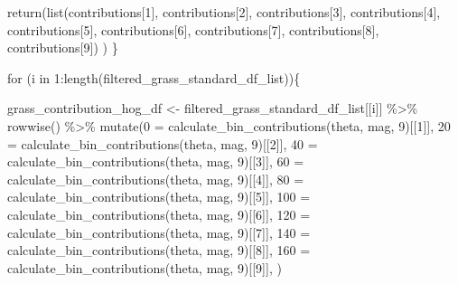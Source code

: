 \documentclass[
  letterpaper,
  DIV=11,
  numbers=noendperiod]{scrreprt}
\newenvironment{Shaded}{\begin{snugshade}}{\end{snugshade}}
\newcommand{\AttributeTok}[1]{\textcolor[rgb]{0.40,0.45,0.13}{#1}}
\newcommand{\ControlFlowTok}[1]{\textcolor[rgb]{0.00,0.23,0.31}{#1}}
\newcommand{\DecValTok}[1]{\textcolor[rgb]{0.68,0.00,0.00}{#1}}
\newcommand{\FunctionTok}[1]{\textcolor[rgb]{0.28,0.35,0.67}{#1}}
\newcommand{\NormalTok}[1]{\textcolor[rgb]{0.00,0.23,0.31}{#1}}
\newcommand{\OtherTok}[1]{\textcolor[rgb]{0.00,0.23,0.31}{#1}}
\newcommand{\SpecialCharTok}[1]{\textcolor[rgb]{0.37,0.37,0.37}{#1}}
\newcommand{\StringTok}[1]{\textcolor[rgb]{0.13,0.47,0.30}{#1}}
\begin{document}
\begin{Shaded}
\begin{Highlighting}[]
  \FunctionTok{return}\NormalTok{(}\FunctionTok{list}\NormalTok{(contributions[}\DecValTok{1}\NormalTok{],}
\NormalTok{         contributions[}\DecValTok{2}\NormalTok{],}
\NormalTok{         contributions[}\DecValTok{3}\NormalTok{],}
\NormalTok{         contributions[}\DecValTok{4}\NormalTok{],}
\NormalTok{         contributions[}\DecValTok{5}\NormalTok{],}
\NormalTok{         contributions[}\DecValTok{6}\NormalTok{],}
\NormalTok{         contributions[}\DecValTok{7}\NormalTok{],}
\NormalTok{         contributions[}\DecValTok{8}\NormalTok{],}
\NormalTok{         contributions[}\DecValTok{9}\NormalTok{])}
\NormalTok{         )}
\NormalTok{\}}
 
\ControlFlowTok{for}\NormalTok{ (i }\ControlFlowTok{in} \DecValTok{1}\SpecialCharTok{:}\FunctionTok{length}\NormalTok{(filtered\_grass\_standard\_df\_list))\{}
  
\NormalTok{  grass\_contribution\_hog\_df }\OtherTok{\textless{}{-}} 
\NormalTok{    filtered\_grass\_standard\_df\_list[[i]] }\SpecialCharTok{\%\textgreater{}\%}
    \FunctionTok{rowwise}\NormalTok{() }\SpecialCharTok{\%\textgreater{}\%}
    \FunctionTok{mutate}\NormalTok{(}\StringTok{\textasciigrave{}}\AttributeTok{0}\StringTok{\textasciigrave{}} \OtherTok{=} \FunctionTok{calculate\_bin\_contributions}\NormalTok{(theta, mag, }\DecValTok{9}\NormalTok{)[[}\DecValTok{1}\NormalTok{]],}
           \StringTok{\textasciigrave{}}\AttributeTok{20}\StringTok{\textasciigrave{}} \OtherTok{=} \FunctionTok{calculate\_bin\_contributions}\NormalTok{(theta, mag, }\DecValTok{9}\NormalTok{)[[}\DecValTok{2}\NormalTok{]],}
           \StringTok{\textasciigrave{}}\AttributeTok{40}\StringTok{\textasciigrave{}} \OtherTok{=} \FunctionTok{calculate\_bin\_contributions}\NormalTok{(theta, mag, }\DecValTok{9}\NormalTok{)[[}\DecValTok{3}\NormalTok{]],}
           \StringTok{\textasciigrave{}}\AttributeTok{60}\StringTok{\textasciigrave{}} \OtherTok{=} \FunctionTok{calculate\_bin\_contributions}\NormalTok{(theta, mag, }\DecValTok{9}\NormalTok{)[[}\DecValTok{4}\NormalTok{]],}
           \StringTok{\textasciigrave{}}\AttributeTok{80}\StringTok{\textasciigrave{}} \OtherTok{=} \FunctionTok{calculate\_bin\_contributions}\NormalTok{(theta, mag, }\DecValTok{9}\NormalTok{)[[}\DecValTok{5}\NormalTok{]],}
           \StringTok{\textasciigrave{}}\AttributeTok{100}\StringTok{\textasciigrave{}} \OtherTok{=} \FunctionTok{calculate\_bin\_contributions}\NormalTok{(theta, mag, }\DecValTok{9}\NormalTok{)[[}\DecValTok{6}\NormalTok{]],}
           \StringTok{\textasciigrave{}}\AttributeTok{120}\StringTok{\textasciigrave{}} \OtherTok{=} \FunctionTok{calculate\_bin\_contributions}\NormalTok{(theta, mag, }\DecValTok{9}\NormalTok{)[[}\DecValTok{7}\NormalTok{]],}
           \StringTok{\textasciigrave{}}\AttributeTok{140}\StringTok{\textasciigrave{}} \OtherTok{=} \FunctionTok{calculate\_bin\_contributions}\NormalTok{(theta, mag, }\DecValTok{9}\NormalTok{)[[}\DecValTok{8}\NormalTok{]],}
           \StringTok{\textasciigrave{}}\AttributeTok{160}\StringTok{\textasciigrave{}} \OtherTok{=} \FunctionTok{calculate\_bin\_contributions}\NormalTok{(theta, mag, }\DecValTok{9}\NormalTok{)[[}\DecValTok{9}\NormalTok{]],}
\NormalTok{           )}
  

\end{Highlighting}
\end{Shaded}
\end{document}
